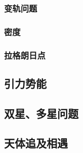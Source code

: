 \documentclass[cn,blue,11pt,normal]{elegantnote}
\begin{document}
\subsubsection{变轨问题}
\begin{proset}
	
\end{proset}
\begin{proset}
	
\end{proset}
\begin{proset}
	
\end{proset}
\subsubsection{密度}
\begin{proset}
	
\end{proset}
\subsubsection{拉格朗日点}
\begin{proset}
	
\end{proset}
\subsection{引力势能}

\begin{proset}
	
\end{proset}

\subsection{双星、多星问题}
\begin{proset}
	
\end{proset}
\begin{proset}
	
\end{proset}

\subsection{天体追及相遇}
\begin{proset}
	
\end{proset}
\begin{proset}
	
\end{proset}
\end{document}
